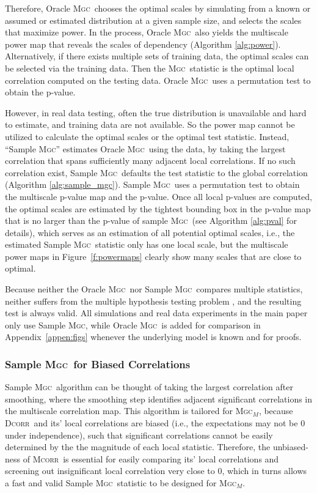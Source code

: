 \documentclass[11pt]{article}
\providecommand{\sct}[1]{{\normalfont\textsc{#1}}}
\newcommand{\Mgc}{\sct{Mgc}}
\newcommand{\Mgcm}{\sct{Mgc$_M$}}
\newcommand{\Dcorr}{\sct{Dcorr}}
\newcommand{\Mcorr}{\sct{Mcorr}}
\begin{document}
Therefore, Oracle \Mgc~chooses the optimal scales by simulating from a known or assumed or estimated distribution at a given sample size, and selects the scales that maximize power. In the process, Oracle \Mgc~also yields the multiscale power map that reveals the scales of dependency (Algorithm \ref{alg:power}). Alternatively, if there exists multiple sets of training data, the optimal scales can be selected via the training data. Then the \Mgc~statistic is the optimal local correlation computed on the testing data. Oracle \Mgc~uses a permutation test to obtain the p-value.

However, in real data testing, often the true distribution is unavailable and hard to estimate, and training data are not available. 
So the power map cannot be utilized to calculate the optimal scales or the optimal test statistic.
Instead,  ``Sample \Mgc''  estimates Oracle \Mgc~using the data, by taking the largest correlation that  spans sufficiently many adjacent local correlations. 
If no such correlation exist, Sample \Mgc~defaults the test statistic to the global correlation (Algorithm \ref{alg:sample_mgc}). 
Sample \Mgc~uses a permutation test to obtain the multiscale p-value map and the p-value. 
% 
Once all local p-values are computed, the optimal scales are estimated by the tightest bounding box in the p-value map that is no larger than the p-value of sample \Mgc~(see Algorithm \ref{alg:pval} for details), which serves as an estimation of all potential optimal scales, i.e., the estimated Sample \Mgc~statistic only has one local scale, but the multiscale power maps in Figure~\ref{f:powermaps} clearly show many scales that are close to optimal.

Because neither the Oracle \Mgc~nor Sample \Mgc~compares multiple statistics, neither suffers from the multiple hypothesis testing problem \cite{Benjamini1995}, and the resulting test is always valid. All simulations and real data experiments in the main paper only use Sample \Mgc, while Oracle \Mgc~is added for comparison in Appendix~\ref{appen:figs} whenever the underlying model is known and for proofs.

\subsubsection*{Sample \Mgc~for Biased Correlations}

Sample \Mgc~algorithm can be thought of taking the largest correlation after smoothing, where the smoothing step identifies adjacent significant correlations in the multiscale correlation map. This algorithm is tailored for \Mgcm, because \Dcorr~and its' local correlations are biased (i.e., the expectations may not be $0$ under independence), such that significant correlations cannot be easily determined by the the magnitude of each local statistic. Therefore, the unbiased-ness of \Mcorr~is essential for easily comparing its' local correlations and screening out insignificant local correlation very close to $0$, which in turns allows a fast and valid Sample \Mgc~statistic to be designed for \Mgcm. 
\end{document}
